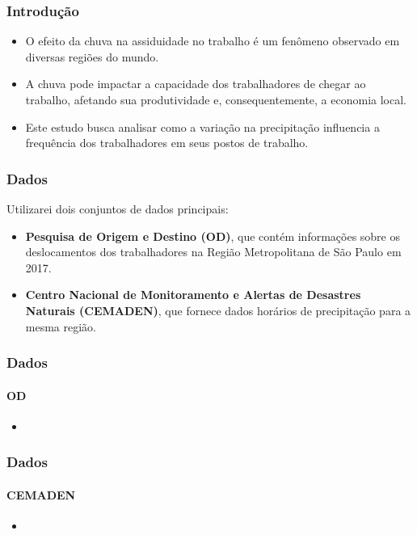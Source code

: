 \begin{frame}
    \frametitle{Introdução}

    \begin{itemize}
        \item O efeito da chuva na assiduidade no trabalho é um fenômeno observado em diversas regiões do mundo.
        \item A chuva pode impactar a capacidade dos trabalhadores de chegar ao trabalho, afetando sua produtividade e, consequentemente, a economia local.
        \item Este estudo busca analisar como a variação na precipitação influencia a frequência dos trabalhadores em seus postos de trabalho.
    \end{itemize}
\end{frame}

\begin{frame}
    \frametitle{Dados}
    Utilizarei dois conjuntos de dados principais:
    \begin{itemize}
        \item \textbf{Pesquisa de Origem e Destino (OD)}, que contém informações sobre os deslocamentos dos trabalhadores na Região Metropolitana de São Paulo em 2017.
        \item \textbf{Centro Nacional de Monitoramento e Alertas de Desastres Naturais (CEMADEN)}, que fornece dados horários de precipitação para a mesma região.
    \end{itemize}
\end{frame}


\begin{frame}
    \frametitle{Dados}
    \framesubtitle{OD}
    \begin{itemize}
        \item
    \end{itemize}
\end{frame}


\begin{frame}
    \frametitle{Dados}
    \framesubtitle{CEMADEN}
    \begin{itemize}
        \item
    \end{itemize}
\end{frame}

